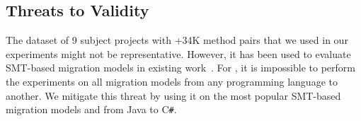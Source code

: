 \subsection{Threats to Validity}

The dataset of 9 subject projects with +34K method pairs that we used
in our experiments might not be representative. However, it has been
used to evaluate SMT-based migration models in existing
work~\cite{fse13,ase15,icsme16}. For {\model}, it is impossible to
perform the experiments on all migration models from any programming
language to another. We mitigate this threat by using it
on the most popular SMT-based migration models and from Java to
C\texttt{\#}.  

